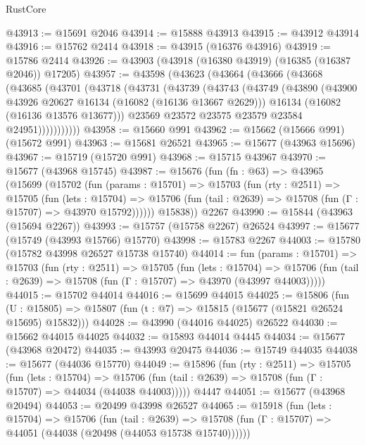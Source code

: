 \begin{lexlean}{RustCore}
\begin{coremodule}
@43913 := @15691 @2046
@43914 := @15888 @43913
@43915 := @43912 @43914
@43916 := @15762 @2414
@43918 := @43915 (@16376 @43916)
@43919 := @15786 @2414
@43926 := @43903 (@43918 (@16380 @43919) (@16385 (@16387 @2046)) @17205)
@43957 := @43598
    (@43623
      (@43664
        (@43666
          (@43668
            (@43685
              (@43701
                (@43718
                  (@43731
                    (@43739
                      (@43743
                        (@43749
                          (@43890
                            (@43900 @43926 @20627 @16134 (@16082 (@16136 @13667 @2629)))
                            @16134
                            (@16082 (@16136 @13576 @13677)))
                          @23569
                          @23572
                          @23575
                          @23579
                          @23584
                          @24951)))))))))))
@43958 := @15660 @991
@43962 := @15662 (@15666 @991) (@15672 @991)
@43963 := @15681 @26521
@43965 := @15677 (@43963 @15696)
@43967 := @15719 (@15720 @991)
@43968 := @15715 @43967
@43970 := @15677 (@43968 @15745)
@43987 := @15676
    (fun (fn : @63) =>
    @43965
      (@15699
        (@15702
          (fun (params : @15701) =>
          @15703
            (fun (rty : @2511) =>
            @15705
              (fun (lets : @15704) =>
              @15706 (fun (tail : @2639) => @15708 (fun (Γ : @15707) => @43970 @15792))))))
        @15838))
    @2267
@43990 := @15844 (@43963 (@15694 @2267))
@43993 := @15757 (@15758 @2267) @26524
@43997 := @15677 (@15749 (@43993 @15766) @15770)
@43998 := @15783 @2267
@44003 := @15780 (@15782 @43998 @26527 @15738 @15740)
@44014 := fun (params : @15701) =>
  @15703
    (fun (rty : @2511) =>
    @15705
      (fun (lets : @15704) =>
      @15706 (fun (tail : @2639) => @15708 (fun (Γ : @15707) => @43970 (@43997 @44003)))))
@44015 := @15702 @44014
@44016 := @15699 @44015
@44025 := @15806
    (fun (U : @15805) => @15807 (fun (t : @7) => @15815 (@15677 (@15821 @26524 @15695) @15832)))
@44028 := @43990 (@44016 @44025) @26522
@44030 := @15662 @44015 @44025
@44032 := @15893 @44014 @4445
@44034 := @15677 (@43968 @20472)
@44035 := @43993 @20475
@44036 := @15749 @44035
@44038 := @15677 (@44036 @15770)
@44049 := @15896
    (fun (rty : @2511) =>
    @15705
      (fun (lets : @15704) =>
      @15706 (fun (tail : @2639) => @15708 (fun (Γ : @15707) => @44034 (@44038 @44003)))))
    @4447
@44051 := @15677 (@43968 @20494)
@44053 := @20499 @43998 @26527
@44065 := @15918
    (fun (lets : @15704) =>
    @15706
      (fun (tail : @2639) =>
      @15708 (fun (Γ : @15707) => @44051 (@44038 (@20498 (@44053 @15738 @15740))))))

\end{coremodule}
\end{lexlean}
